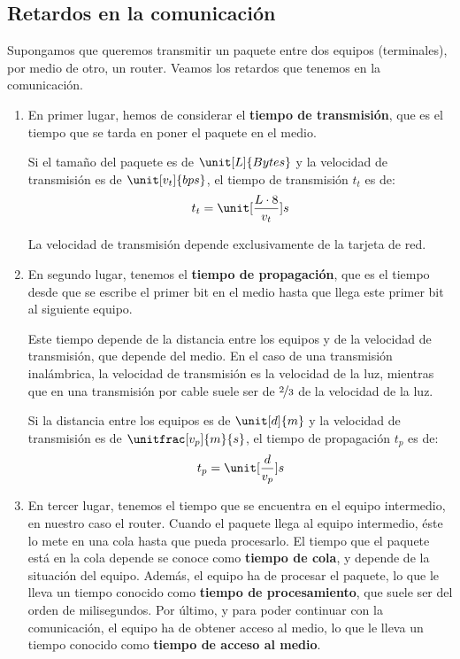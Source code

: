 \subsection{Retardos en la comunicación}
Supongamos que queremos transmitir un paquete entre dos equipos (terminales), por medio de otro, un router. Veamos los retardos que tenemos en la comunicación. 
\begin{enumerate}
    \item En primer lugar, hemos de considerar el \textbf{tiempo de transmisión}, que es el tiempo que se tarda en poner el paquete en el medio.
    
    Si el tamaño del paquete es de $\unit[L]{Bytes}$ y la velocidad de transmisión es de $\unit[v_t]{bps}$, el tiempo de transmisión $t_t$ es de:
    \begin{equation*}
        t_t = \unit[\frac{L\cdot 8}{v_t}]{s}
    \end{equation*}

    La velocidad de transmisión depende exclusivamente de la tarjeta de red.

    \item En segundo lugar, tenemos el \textbf{tiempo de propagación}, que es el tiempo desde que se escribe el primer bit en el medio hasta que llega este primer bit al siguiente equipo.
    
    Este tiempo depende de la distancia entre los equipos y de la velocidad de transmisión, que depende del medio. En el caso de una transmisión inalámbrica, la velocidad de transmisión es la velocidad de la luz, mientras que en una transmisión por cable suele ser de $\nicefrac{2}{3}$ de la velocidad de la luz.

    Si la distancia entre los equipos es de $\unit[d]{m}$ y la velocidad de transmisión es de $\unitfrac[v_p]{m}{s}$, el tiempo de propagación $t_p$ es de:
    \begin{equation*}
        t_p = \unit[\frac{d}{v_p}]{s}
    \end{equation*}

    \item En tercer lugar, tenemos el tiempo que se encuentra en el equipo intermedio, en nuestro caso el router. Cuando el paquete llega al equipo intermedio, éste lo mete en una cola hasta que pueda procesarlo. El tiempo que el paquete está en la cola depende se conoce como \textbf{tiempo de cola}, y depende de la situación del equipo. Además, el equipo ha de procesar el paquete, lo que le lleva un tiempo conocido como \textbf{tiempo de procesamiento}, que suele ser del orden de milisegundos. Por último, y para poder continuar con la comunicación, el equipo ha de obtener acceso al medio, lo que le lleva un tiempo conocido como \textbf{tiempo de acceso al medio}.
    

\end{enumerate}
